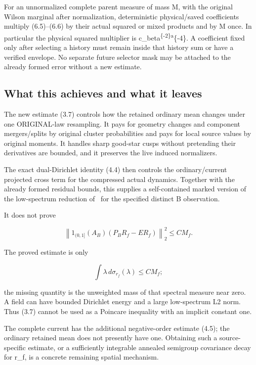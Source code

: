 \documentclass[
  11pt,
]{article}
\begin{document}
For an unnormalized complete parent measure of mass M, with the original
Wilson marginal after normalization, deterministic physical/saved
coefficients multiply (6.5)--(6.6) by their actual squared or mixed
products and by M once. In particular the physical squared multiplier is
c\_beta\textsuperscript{\{-2\}a}\{-4\}. A coefficient fixed only after
selecting a history must remain inside that history sum or have a
verified envelope. No separate future selector mask may be attached to
the already formed error without a new estimate.

\hypertarget{what-this-achieves-and-what-it-leaves}{%
\subsection{What this achieves and what it
leaves}\label{what-this-achieves-and-what-it-leaves}}

The new estimate (3.7) controls how the retained ordinary mean changes
under one ORIGINAL-law resampling. It pays for geometry changes and
component mergers/splits by original cluster probabilities and pays for
local source values by original moments. It handles sharp good-star
cusps without pretending their derivatives are bounded, and it preserves
the live induced normalizers.

The exact dual-Dirichlet identity (4.4) then controls the
ordinary/current projected cross term for the compressed actual
dynamics. Together with the already formed residual bounds, this
supplies a self-contained marked version of the low-spectrum
reduction of~\cite[\S2]{OS} for the specified distinct B observation.

It does not prove

\[
 \left\|1_{(0,1]}(A_B)(P_BR_f-ER_f)\right\|_2^2\le CM_f.
 \tag{7.1}
\]

The proved estimate is only

\[
 \int\lambda\,d\sigma_{r_f}(\lambda)\le CM_f;
 \tag{7.2}
\]

the missing quantity is the unweighted mass of that spectral measure
near zero. A field can have bounded Dirichlet energy and a large
low-spectrum L2 norm. Thus (3.7) cannot be used as a Poincare inequality
with an implicit constant one.

The complete current has the additional negative-order estimate (4.5);
the ordinary retained mean does not presently have one. Obtaining such a
source-specific estimate, or a sufficiently integrable annealed
semigroup covariance decay for r\_f, is a concrete remaining spatial
mechanism.
\end{document}
